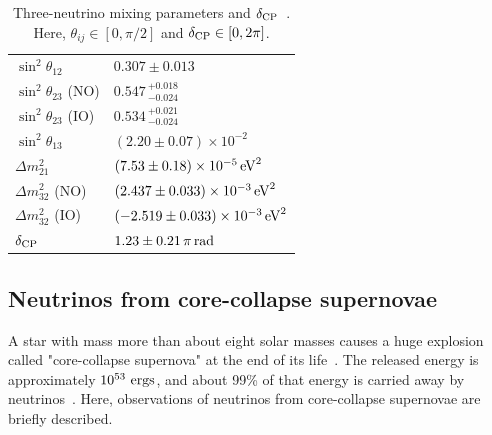 \begin{table}[h]
	\caption[Three-neutrino mixing parameters and $\delta_{{\rm CP}}$]{
	Three-neutrino mixing parameters and $\delta_{{\rm CP}}$~\cite{PDG}.
	Here, $\theta_{ij}\in[0,\pi/2]$ and $\delta_{{\rm CP}}\in[0,2\pi]$.
	}\label{Introd_Tab:Neu}
	\centering
	\vs
	\begin{tabular}{ll} \hline \hline
		$\sin^{2}\theta_{12}$     & $0.307 \pm 0.013$                                 \\
		$\sin^{2}\theta_{23}$ (NO)& $0.547\,^{+0.018}_{-0.024}$                       \\
		$\sin^{2}\theta_{23}$ (IO)& $0.534\,^{+0.021}_{-0.024}$                       \\
		$\sin^{2}\theta_{13}$     & $(2.20 \pm 0.07) \times 10^{-2}$                  \\
		$\Delta m_{21}^{2}$       & $(7.53 \pm 0.18) \times 10^{-5}\,{\rm eV}^{2}$    \\
		$\Delta m_{32}^{2}$ (NO)  & $(2.437 \pm 0.033) \times 10^{-3}\,{\rm eV}^{2}$  \\
		$\Delta m_{32}^{2}$ (IO)  & $(-2.519 \pm 0.033) \times 10^{-3}\,{\rm eV}^{2}$ \\
		$\delta_{\rm CP}$         & $1.23 \pm 0.21\,\pi\,{\rm rad}$                   \\ \hline \hline
	\end{tabular}
\end{table}





\subsection{Neutrinos from core-collapse supernovae}
\vs\hs
A star with mass more than about eight solar masses causes a huge explosion called "core-collapse supernova" at the end of its life~\cite{1988Hirata,2013Burrows}.
The released energy is approximately $10^{53}~{\rm ergs}$, and about 99\% of that energy is carried away by neutrinos~\cite{1990Burrows}.
Here, observations of neutrinos from core-collapse supernovae are briefly described.

